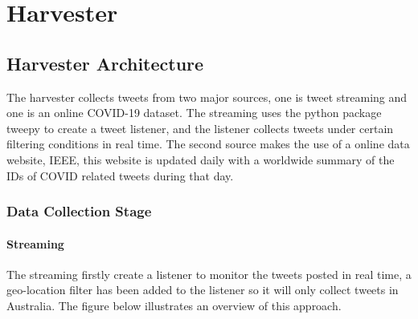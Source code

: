 \section{Harvester}
\subsection{Harvester Architecture}

The harvester collects tweets from two major sources, one is tweet streaming and one is an online COVID-19 dataset. The streaming uses the python package tweepy to create a tweet listener, and the listener collects tweets under certain filtering conditions in real time. The second source makes the use of a online data website, IEEE, this website is updated daily with a worldwide summary of the IDs of COVID related tweets during that day.
\subsubsection{Data Collection Stage}
\paragraph{Streaming}

The streaming firstly create a listener to monitor the tweets posted in real time, a geo-location filter has been added to the listener so it will only collect tweets in Australia. The figure below illustrates an overview of this approach. 

